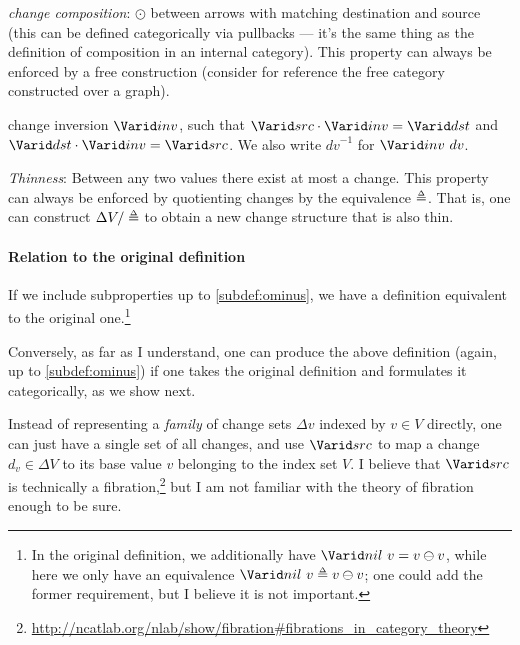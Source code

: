 \begin{definition}
\begin{subdefinition}[resume]
\item \label{subdef:composition} \emph{change composition}:
  $\odot$ between arrows with matching destination and
  source (this can be defined categorically via pullbacks --- it's the same
  thing as the definition of composition in an internal category). This property
  can always be enforced by a free construction (consider for reference the free
  category constructed over a graph).
\item \label{subdef:groupoid} change inversion $\Term{inv}$, such that
  $\Term{src} \cdot \Term{inv} = \Term{dst}$ and
  $\Term{dst} \cdot \Term{inv} = \Term{src}$. We also write ${dv}^{-1}$ for
  $\Term{inv}\ dv$.
\item \label{subdef:thin} \emph{Thinness}: Between any two values there exist at
  most a change. This property can always be enforced by quotienting changes by
  the equivalence $\Doe$. That is, one can construct $\Delta V / \Doe$ to
  obtain a new change structure that is also thin.
\end{subdefinition}
\end{definition}

\paragraph{Relation to the original definition}
If we include subproperties up to \cref{subdef:ominus}, we have a definition
equivalent to the original one.\footnote{In the original definition, we
  additionally have $\Term{nil}\ v = v \ominus v$, while here we only have an
  equivalence $\Term{nil}\ v \Doe v \ominus v$; one could add the former requirement,
  but I believe it is not important.}

Conversely, as far as I understand, one can produce the above definition (again,
up to \cref{subdef:ominus}) if one takes the original definition and
formulates it categorically, as we show next.

Instead of representing a \emph{family} of change sets $\Delta v$ indexed by
$v \in V$ directly, one can just have a single set of all changes, and use
$\Term{src}$ to map a change $d_v \in \Delta V$ to its base value $v$ belonging
to the index set $V$. I believe that $\Term{src}$ is technically a
fibration,\footnote{\url{http://ncatlab.org/nlab/show/fibration\#fibrations_in_category_theory}}
but I am not familiar with the theory of fibration enough to be sure.

